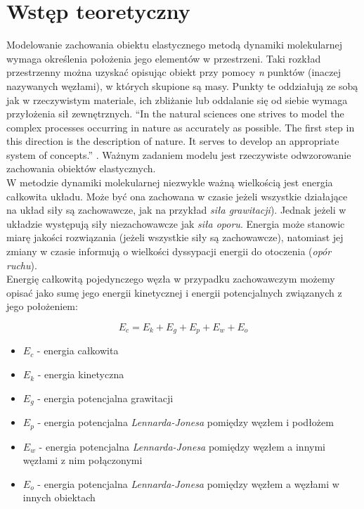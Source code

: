 \documentclass[12pt, letterpaper]{report}
\begin{document}
    
\chapter{Wstęp teoretyczny}

    Modelowanie zachowania obiektu elastycznego metodą dynamiki molekularnej wymaga określenia 
    położenia jego elementów w przestrzeni. Taki rozkład przestrzenny można uzyskać opisując 
    obiekt przy pomocy \emph{n} punktów (inaczej nazywanych węzłami), w 
    których skupione są masy. Punkty te oddziałują ze sobą jak w rzeczywistym materiale, ich 
    zbliżanie lub oddalanie się od siebie wymaga przyłożenia sił zewnętrznych.
    ``In the natural sciences one strives to model the complex 
        processes occurring in nature as accurately as possible. 
        The first step in this direction is the description of nature. 
        It serves to develop an appropriate system of concepts.'' \cite{moleculardynamics}. 
    Ważnym zadaniem modelu jest rzeczywiste odwzorowanie zachowania obiektów elastycznych. \\

    W metodzie dynamiki molekularnej niezwykle ważną wielkością jest energia całkowita układu.
    Może być ona zachowana w czasie jeżeli wszystkie działające 
    na układ siły są zachowawcze, jak na przykład \emph{siła grawitacji}). 
    Jednak jeżeli w układzie występują siły niezachowawcze jak \emph{siła oporu}. 
    Energia może stanowic miarę jakości rozwiązania (jeżeli wszystkie siły są zachowawcze), 
    natomiast jej zmiany w czasie informują o wielkości dyssypacji energii do otoczenia (\emph{opór ruchu}). \\

    Energię całkowitą pojedynczego węzła w przypadku zachowawczym 
    możemy opisać jako sumę jego energii kinetycznej i 
    energii potencjalnych związanych z jego położeniem:

    \begin{equation}
        E_{c} = E_{k} + E_{g} + E_{p} + E_{w} + E_{o}
    \end{equation}

    \begin{itemize}
        \item $E_{c}$ - energia całkowita
        \item $E_{k}$ - energia kinetyczna
        \item $E_{g}$ - energia potencjalna grawitacji
        \item $E_{p}$ - energia potencjalna \emph{Lennarda-Jonesa} 
        pomiędzy węzłem i podłożem
        \item $E_{w}$ - energia potencjalna \emph{Lennarda-Jonesa} 
        pomiędzy węzłem a innymi węzłami z nim połączonymi
        \item $E_{o}$ - energia potencjalna \emph{Lennarda-Jonesa} 
        pomiędzy węzłem a węzłami w innych obiektach
    \end{itemize}
\end{document}
